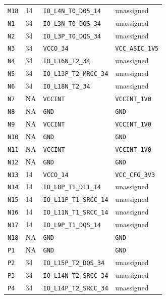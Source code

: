 \documentclass[11pt,a4paper]{article}
\begin{document}
\begin{longtable}{@{}P{13mm}P{13mm}P{78mm}P{62mm}@{}}
\nolinkurl{M18} & 14 & \nolinkurl{IO_L4N_T0_D05_14} & \textcolor{muted}{unassigned} \\
\nolinkurl{N1} & 34 & \nolinkurl{IO_L3N_T0_DQS_34} & \textcolor{muted}{unassigned} \\
\nolinkurl{N2} & 34 & \nolinkurl{IO_L3P_T0_DQS_34} & \textcolor{muted}{unassigned} \\
\nolinkurl{N3} & 34 & \nolinkurl{VCCO_34} & \nolinkurl{VCC_ASIC_1V5} \\
\nolinkurl{N4} & 34 & \nolinkurl{IO_L16N_T2_34} & \textcolor{muted}{unassigned} \\
\nolinkurl{N5} & 34 & \nolinkurl{IO_L13P_T2_MRCC_34} & \textcolor{muted}{unassigned} \\
\nolinkurl{N6} & 34 & \nolinkurl{IO_L18N_T2_34} & \textcolor{muted}{unassigned} \\
\nolinkurl{N7} & NA & \nolinkurl{VCCINT} & \nolinkurl{VCCINT_1V0} \\
\nolinkurl{N8} & NA & \nolinkurl{GND} & \nolinkurl{GND} \\
\nolinkurl{N9} & NA & \nolinkurl{VCCINT} & \nolinkurl{VCCINT_1V0} \\
\nolinkurl{N10} & NA & \nolinkurl{GND} & \nolinkurl{GND} \\
\nolinkurl{N11} & NA & \nolinkurl{VCCINT} & \nolinkurl{VCCINT_1V0} \\
\nolinkurl{N12} & NA & \nolinkurl{GND} & \nolinkurl{GND} \\
\nolinkurl{N13} & 14 & \nolinkurl{VCCO_14} & \nolinkurl{VCC_CFG_3V3} \\
\nolinkurl{N14} & 14 & \nolinkurl{IO_L8P_T1_D11_14} & \textcolor{muted}{unassigned} \\
\nolinkurl{N15} & 14 & \nolinkurl{IO_L11P_T1_SRCC_14} & \textcolor{muted}{unassigned} \\
\nolinkurl{N16} & 14 & \nolinkurl{IO_L11N_T1_SRCC_14} & \textcolor{muted}{unassigned} \\
\nolinkurl{N17} & 14 & \nolinkurl{IO_L9P_T1_DQS_14} & \textcolor{muted}{unassigned} \\
\nolinkurl{N18} & NA & \nolinkurl{GND} & \nolinkurl{GND} \\
\nolinkurl{P1} & NA & \nolinkurl{GND} & \nolinkurl{GND} \\
\nolinkurl{P2} & 34 & \nolinkurl{IO_L15P_T2_DQS_34} & \textcolor{muted}{unassigned} \\
\nolinkurl{P3} & 34 & \nolinkurl{IO_L14N_T2_SRCC_34} & \textcolor{muted}{unassigned} \\
\nolinkurl{P4} & 34 & \nolinkurl{IO_L14P_T2_SRCC_34} & \textcolor{muted}{unassigned} \\

\end{longtable}
\end{document}
